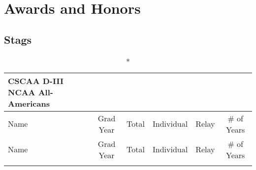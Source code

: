 \section{Awards and Honors }

\subsection{Stags}

\begin{longtable}{lccccc}
    \caption*{CSCAA D-III NCAA All-Americans} \\
    \toprule
    Name & Grad Year & Total & Individual & Relay & \# of Years \\
    \midrule
    \endfirsthead
    
    \toprule
    Name & Grad Year & Total & Individual & Relay & \# of Years \\
    \midrule
    \endhead
    
    \bottomrule
    \endfoot
    

\end{longtable}
